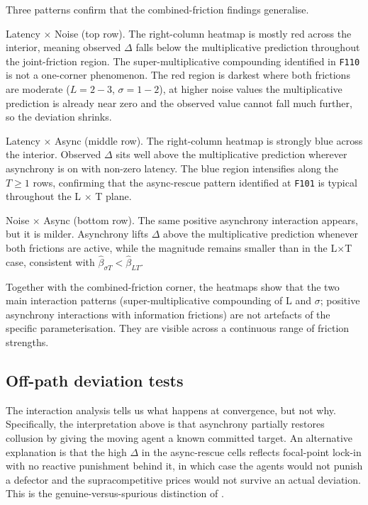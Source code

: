 Three patterns confirm that the combined-friction findings generalise.

Latency $\times$ Noise (top row). The right-column heatmap is mostly red across the interior, meaning observed $\Delta$ falls below the multiplicative prediction throughout the joint-friction region. The super-multiplicative compounding identified in \texttt{F110} is not a one-corner phenomenon. The red region is darkest where both frictions are moderate ($L=2{-}3$, $\sigma=1{-}2$), at higher noise values the multiplicative prediction is already near zero and the observed value cannot fall much further, so the deviation shrinks.

Latency $\times$ Async (middle row). The right-column heatmap is strongly blue across the interior. Observed $\Delta$ sits well above the multiplicative prediction wherever asynchrony is on with non-zero latency. The blue region intensifies along the $T \geq 1$ rows, confirming that the async-rescue pattern identified at \texttt{F101} is typical throughout the L $\times$ T plane.

Noise $\times$ Async (bottom row). The same positive asynchrony interaction appears, but it is milder. Asynchrony lifts $\Delta$ above the multiplicative prediction whenever both frictions are active, while the magnitude remains smaller than in the L$\times$T case, consistent with $\widehat\beta_{\sigma T} < \widehat\beta_{LT}$.

Together with the combined-friction corner, the heatmaps show that the two main interaction patterns (super-multiplicative compounding of L and $\sigma$; positive asynchrony interactions with information frictions) are not artefacts of the specific parameterisation. They are visible across a continuous range of friction strengths.

\subsection{Off-path deviation tests}
\label{sec:factorial-offpath}

The interaction analysis tells us what happens at convergence, but not why. Specifically, the interpretation above is that asynchrony partially restores collusion by giving the moving agent a known committed target. An alternative explanation is that the high $\Delta$ in the async-rescue cells reflects focal-point lock-in with no reactive punishment behind it, in which case the agents would not punish a defector and the supracompetitive prices would not survive an actual deviation. This is the genuine-versus-spurious distinction of \citet{calvano2023}.

